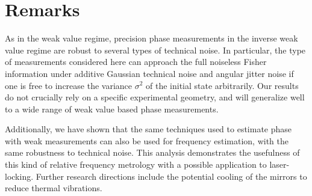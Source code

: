 \section{Remarks}
As in the weak value regime, precision phase measurements in the inverse weak value regime are robust to several types of technical noise.  In particular, the type of measurements considered here can approach the full noiseless Fisher information under additive Gaussian technical noise and angular jitter noise if one is free to increase the variance $\sigma^2$ of the initial state arbitrarily.  Our results do not crucially rely on a specific experimental geometry, and will generalize well to a wide range of weak value based phase measurements. 

Additionally, we have shown that the same techniques used to estimate phase with weak measurements can also be used for frequency estimation, with the same robustness to technical noise.  This analysis demonstrates the usefulness of this kind of relative frequency metrology with a possible application to laser-locking.  Further research directions include the potential cooling of the mirrors to reduce thermal vibrations.




